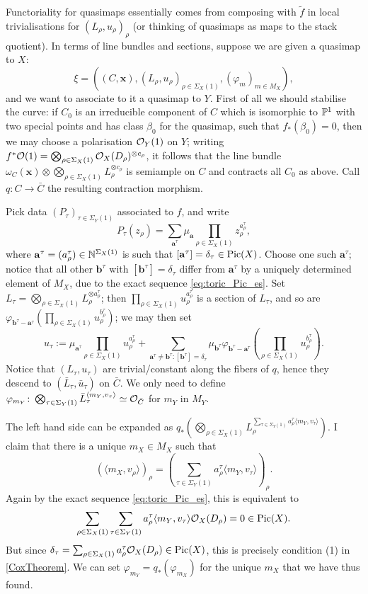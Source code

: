 Functoriality for quasimaps essentially comes from composing with $\tilde{f}$ in local trivialisations for $(L_\rho,u_\rho)_\rho$ (or thinking of quasimaps as maps to the stack quotient). In terms of line bundles and sections, suppose we are given a quasimap to $X$: \[\xi=\left( (C,\mathbf x),(L_\rho,u_\rho)_{\rho\in\Sigma_X(1)},(\varphi_m)_{m\in M_X}\right),\]
and we want to associate to it a quasimap to $Y$. First of all we should stabilise the curve: if $C_0$ is an irreducible component of $C$ which is isomorphic to $\mathbb P^1$ with two special points and has class $\beta_0$ for the quasimap, such that $f_*(\beta_0)=0$, then we may choose a polarisation $\mathcal{O}_Y(1)$ on $Y$; writing $f^*\mathcal{O}(1)=\bigotimes_{\rho\in\Sigma_X(1)}\mathcal{O}_X(D_\rho)^{\otimes c_\rho}$, it follows that the line bundle $\omega_C(\mathbf x)\otimes \bigotimes_{\rho\in\Sigma_X(1)}L_\rho^{\otimes c_\rho}$ is semiample on $C$ and contracts all $C_0$ as above. Call $q\colon C\to \bar C$ the resulting contraction morphism.

Pick data $(P_\tau)_{\tau\in\Sigma_Y(1)}$ associated to $f$, and write \[P_\tau(z_\rho)=\sum_{\mathbf a^\tau}\mu_{\mathbf a}\prod_{\rho\in\Sigma_X(1)}z_\rho^{a^\tau_\rho},\] where $\mathbf a^\tau=(a^\tau_\rho)\in\mathbb{N}^{\Sigma_X(1)}$ is such that $[\mathbf a^\tau]=\delta_\tau\in\operatorname{Pic}(X)$. Choose one such $\mathbf a^\tau$; notice that all other $\mathbf b^\tau$ with $[\mathbf b^\tau]=\delta_\tau$ differ from $\mathbf a^\tau$ by a uniquely determined element of $M_X$, due to the exact sequence \eqref{eq:toric_Pic_es}. Set $L_\tau=\bigotimes_{\rho\in\Sigma_X(1)}L_\rho^{\otimes a^\tau_\rho}$; then $\prod_{\rho\in\Sigma_X(1)}u_\rho^{a^\tau_\rho}$ is a section of $L_\tau$, and so are $\varphi_{\mathbf b^\tau-\mathbf a^\tau}(\prod_{\rho\in\Sigma_X(1)}u_\rho^{b^\tau_\rho})$; we may then set 
\[u_\tau:=\mu_{\mathbf a^\tau}\prod_{\rho\in\Sigma_X(1)}u_\rho^{a^\tau_\rho}+\sum_{\mathbf a^\tau\neq \mathbf b^\tau:[\mathbf b^\tau]=\delta_\tau}\mu_{\mathbf b^\tau}\varphi_{\mathbf b^\tau-\mathbf a^\tau}\left(\prod_{\rho\in\Sigma_X(1)}u_\rho^{b^\tau_\rho}\right).\]
Notice that $(L_\tau,u_\tau)$ are trivial/constant along the fibers of $q$, hence they descend to $(\bar L_\tau,\bar u_\tau)$ on $\bar C$. We only need to define $\varphi_{m_Y}\colon \bigotimes_{\tau\in\Sigma_Y(1)}\bar L_\tau^{\langle m_Y,v_\tau\rangle}\simeq \mathcal{O}_{\bar C}$ for $m_Y$ in $M_Y$.

The left hand side can be expanded as $q_*\left(\bigotimes_{\rho\in\Sigma_X(1)}L_\rho^{\sum_{\tau\in\Sigma_Y(1)}a^\tau_\rho \langle m_Y,v_\tau\rangle} \right)$. I claim that there is a unique $m_X\in M_X$ such that \[(\langle m_X,v_\rho\rangle)_\rho= (\sum_{\tau\in\Sigma_Y(1)}a^\tau_\rho \langle m_Y,v_\tau\rangle)_\rho.\] Again by the exact sequence \eqref{eq:toric_Pic_es}, this is equivalent to \[\sum_{\rho\in\Sigma_X(1)}\sum_{\tau\in\Sigma_Y(1)}a^\tau_\rho \langle m_Y,v_\tau\rangle\mathcal{O}_X(D_\rho)=0\in\operatorname{Pic}(X).\] But since $\delta_\tau=\sum_{\rho\in\Sigma_X(1)}a^\tau_\rho\mathcal{O}_X(D_\rho)\in \operatorname{Pic}(X)$, this is precisely condition (1) in \ref{CoxTheorem}. We can set $\varphi_{m_Y}=q_*(\varphi_{m_X})$ for the unique $m_X$ that we have thus found.

